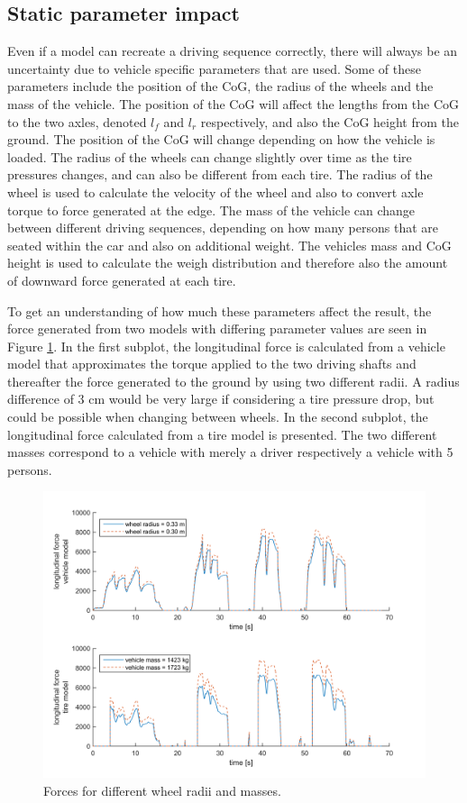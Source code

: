 \subsection{Static parameter impact} 
Even if a model can recreate a driving sequence correctly, there will always be an uncertainty due to vehicle specific parameters that are used. Some of these parameters include the position of the CoG, the radius of the wheels and the mass of the vehicle. The position of the CoG will affect the lengths from the CoG to the two axles, denoted $ l_{f} $ and $ l_{r} $ respectively, and also the CoG height from the ground. The position of the CoG will change depending on how the vehicle is loaded. The radius of the wheels can change slightly over time as the tire pressures changes, and can also be different from each tire. The radius of the wheel is used to calculate the velocity of the wheel and also to convert axle torque to force generated at the edge. The mass of the vehicle can change between different driving sequences, depending on how many persons that are seated within the car and also on additional weight. The vehicles mass and CoG height is used to calculate the weigh distribution and therefore also the amount of downward force generated at each tire. 

To get an understanding of how much these parameters affect the result, the force generated from two models with differing parameter values are seen in Figure \ref{force_diff_re_mass}. In the first subplot, the longitudinal force is calculated from a vehicle model that approximates the torque applied to the two driving shafts and thereafter the force generated to the ground by using two different radii. A radius difference of $ 3 $ cm would be very large if considering a tire pressure drop, but could be possible when changing between wheels. In the second subplot, the longitudinal force calculated from a tire model is presented. The two different masses correspond to a vehicle with merely a driver respectively a vehicle with 5 persons. 

\begin{figure}[h]
	\centering
	\includegraphics[width=1.0\textwidth]{Pictures/force_diff_re_mass}
	\caption {Forces for different wheel radii and masses.}
	\label{force_diff_re_mass}
\end{figure}

